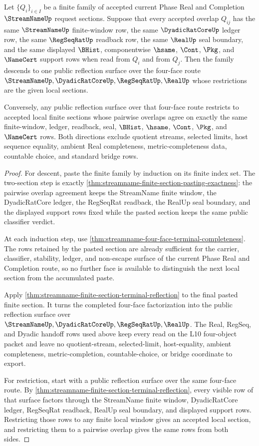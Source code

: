 \begin{theorem}
\label{thm:streamname-finite-section-descent-gluing}
Let $\{Q_i\}_{i \in I}$ be a finite family of accepted current Phase Real and
Completion $\StreamNameUp$ request sections. Suppose that every accepted
overlap $Q_{ij}$ has the same $\StreamNameUp$ finite-window row, the same
$\DyadicRatCoreUp$ ledger row, the same $\RegSeqRatUp$ readback row, the same
$\RealUp$ seal boundary, and the same displayed $\BHist$, componentwise
$\hsame$, $\Cont$, $\Pkg$, and $\NameCert$ support rows when read from
$Q_i$ and from $Q_j$. Then the family descends to one public reflection surface
over the four-face route
$\StreamNameUp,\DyadicRatCoreUp,\RegSeqRatUp,\RealUp$ whose restrictions are
the given local sections.

Conversely, any public reflection surface over that four-face route restricts
to accepted local finite sections whose pairwise overlaps agree on exactly the
same finite-window, ledger, readback, seal, $\BHist$, $\hsame$, $\Cont$,
$\Pkg$, and $\NameCert$ rows. Both directions exclude quotient streams,
selected limits, host sequence equality, ambient Real completeness,
metric-completeness data, countable choice, and standard bridge rows.
\end{theorem}
\begin{proof}
For descent, paste the finite family by induction on its finite index set. The
two-section step is exactly
\autoref{thm:streamname-finite-section-pasting-exactness}: the pairwise
overlap agreement keeps the StreamName finite window, the DyadicRatCore
ledger, the RegSeqRat readback, the RealUp seal boundary, and the displayed
support rows fixed while the pasted section keeps the same public classifier
verdict.

At each induction step, use
\autoref{thm:streamname-four-face-terminal-completeness}. The rows retained by
the pasted section are already sufficient for the carrier, classifier,
stability, ledger, and non-escape surface of the current Phase Real and
Completion route, so no further face is available to distinguish the next
local section from the accumulated paste.

Apply \autoref{thm:streamname-finite-section-terminal-reflection} to the final
pasted finite section. It turns the completed four-face factorization into the
public reflection surface over
$\StreamNameUp,\DyadicRatCoreUp,\RegSeqRatUp,\RealUp$. The Real, RegSeq, and
Dyadic handoff rows used above keep every read on the L10 four-object packet
and leave no quotient-stream, selected-limit, host-equality, ambient
completeness, metric-completion, countable-choice, or bridge coordinate to
export.

For restriction, start with a public reflection surface over the same
four-face route. By
\autoref{thm:streamname-finite-section-terminal-reflection}, every visible row
of that surface factors through the StreamName finite window, DyadicRatCore
ledger, RegSeqRat readback, RealUp seal boundary, and displayed support rows.
Restricting those rows to any finite local window gives an accepted local
section, and restricting them to a pairwise overlap gives the same rows from
both sides.
\end{proof}

